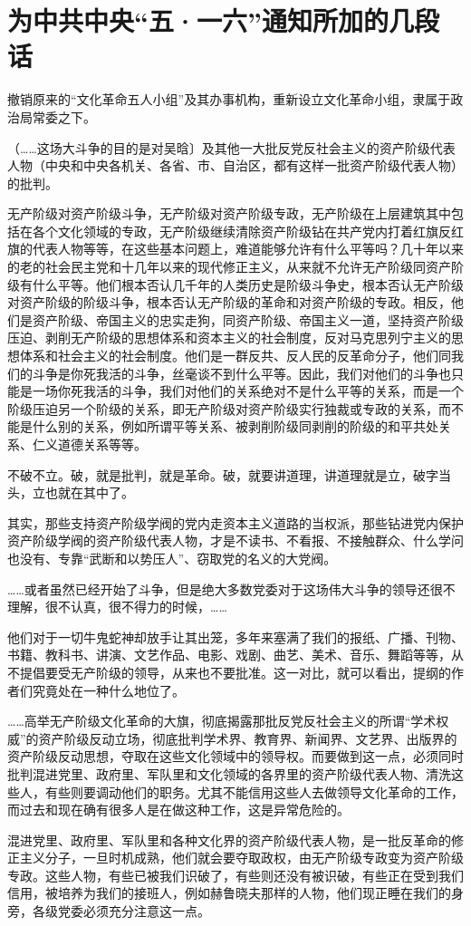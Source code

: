 \section[为中共中央“五·一六”通知所加的几段话（一九六六年五月十六日）]{为中共中央“五·一六”通知所加的几段话}


撤销原来的“文化革命五人小组”及其办事机构，重新设立文化革命小组，隶属于政治局常委之下。

（……这场大斗争的目的是对吴晗〕及其他一大批反党反社会主义的资产阶级代表人物（中央和中央各机关、各省、市、自治区，都有这样一批资产阶级代表人物）的批判。

无产阶级对资产阶级斗争，无产阶级对资产阶级专政，无产阶级在上层建筑其中包括在各个文化领域的专政，无产阶级继续清除资产阶级钻在共产党内打着红旗反红旗的代表人物等等，在这些基本问题上，难道能够允许有什么平等吗？几十年以来的老的社会民主党和十几年以来的现代修正主义，从来就不允许无产阶级同资产阶级有什么平等。他们根本否认几千年的人类历史是阶级斗争史，根本否认无产阶级对资产阶级的阶级斗争，根本否认无产阶级的革命和对资产阶级的专政。相反，他们是资产阶级、帝国主义的忠实走狗，同资产阶级、帝国主义一道，坚持资产阶级压迫、剥削无产阶级的思想体系和资本主义的社会制度，反对马克思列宁主义的思想体系和社会主义的社会制度。他们是一群反共、反人民的反革命分子，他们同我们的斗争是你死我活的斗争，丝毫谈不到什么平等。因此，我们对他们的斗争也只能是一场你死我活的斗争，我们对他们的关系绝对不是什么平等的关系，而是一个阶级压迫另一个阶级的关系，即无产阶级对资产阶级实行独裁或专政的关系，而不能是什么别的关系，例如所谓平等关系、被剥削阶级同剥削的阶级的和平共处关系、仁义道德关系等等。

不破不立。破，就是批判，就是革命。破，就要讲道理，讲道理就是立，破字当头，立也就在其中了。

其实，那些支持资产阶级学阀的党内走资本主义道路的当权派，那些钻进党内保护资产阶级学阀的资产阶级代表人物，才是不读书、不看报、不接触群众、什么学问也没有、专靠“武断和以势压人”、窃取党的名义的大党阀。

……或者虽然已经开始了斗争，但是绝大多数党委对于这场伟大斗争的领导还很不理解，很不认真，很不得力的时候，……

他们对于一切牛鬼蛇神却放手让其出笼，多年来塞满了我们的报纸、广播、刊物、书籍、教科书、讲演、文艺作品、电影、戏剧、曲艺、美术、音乐、舞蹈等等，从不提倡要受无产阶级的领导，从来也不要批准。这一对比，就可以看出，提纲的作者们究竟处在一种什么地位了。

……高举无产阶级文化革命的大旗，彻底揭露那批反党反社会主义的所谓“学术权威”的资产阶级反动立场，彻底批判学术界、教育界、新闻界、文艺界、出版界的资产阶级反动思想，夺取在这些文化领域中的领导权。而要做到这一点，必须同时批判混进党里、政府里、军队里和文化领域的各界里的资产阶级代表人物、清洗这些人，有些则要调动他们的职务。尤其不能信用这些人去做领导文化革命的工作，而过去和现在确有很多人是在做这种工作，这是异常危险的。

混进党里、政府里、军队里和各种文化界的资产阶级代表人物，是一批反革命的修正主义分子，一旦时机成熟，他们就会要夺取政权，由无产阶级专政变为资产阶级专政。这些人物，有些已被我们识破了，有些则还没有被识破，有些正在受到我们信用，被培养为我们的接班人，例如赫鲁晓夫那样的人物，他们现正睡在我们的身旁，各级党委必须充分注意这一点。


